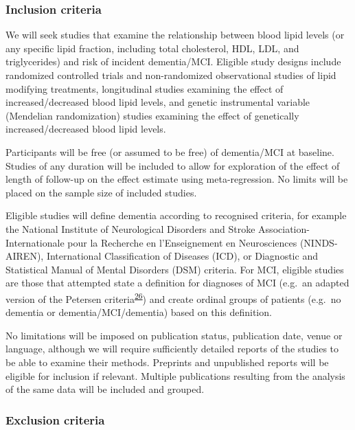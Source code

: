 \documentclass[a4paper, twoside]{templates/ociamthesis}
\begin{document}
\hypertarget{inclusion-criteria}{%
\subsubsection{Inclusion criteria}\label{inclusion-criteria}}

We will seek studies that examine the relationship between blood lipid levels (or any specific lipid fraction, including total cholesterol, HDL, LDL, and triglycerides) and risk of incident dementia/MCI. Eligible study designs include randomized controlled trials and non-randomized observational studies of lipid modifying treatments, longitudinal studies examining the effect of increased/decreased blood lipid levels, and genetic instrumental variable (Mendelian randomization) studies examining the effect of genetically increased/decreased blood lipid levels.

Participants will be free (or assumed to be free) of dementia/MCI at baseline. Studies of any duration will be included to allow for exploration of the effect of length of follow-up on the effect estimate using meta-regression. No limits will be placed on the sample size of included studies.

Eligible studies will define dementia according to recognised criteria, for example the National Institute of Neurological Disorders and Stroke Association-Internationale pour la Recherche en l'Enseignement en Neurosciences (NINDS-AIREN), International Classification of Diseases (ICD), or Diagnostic and Statistical Manual of Mental Disorders (DSM) criteria. For MCI, eligible studies are those that attempted state a definition for diagnoses of MCI (e.g.~an adapted version of the Petersen criteria\textsuperscript{\protect\hyperlink{ref-petersen1999}{26}}) and create ordinal groups of patients (e.g.~no dementia or dementia/MCI/dementia) based on this definition.

No limitations will be imposed on publication status, publication date, venue or language, although we will require sufficiently detailed reports of the studies to be able to examine their methods. Preprints and unpublished reports will be eligible for inclusion if relevant. Multiple publications resulting from the analysis of the same data will be included and grouped.

\hypertarget{exclusion-criteria}{%
\subsubsection{Exclusion criteria}\label{exclusion-criteria}}
\end{document}
